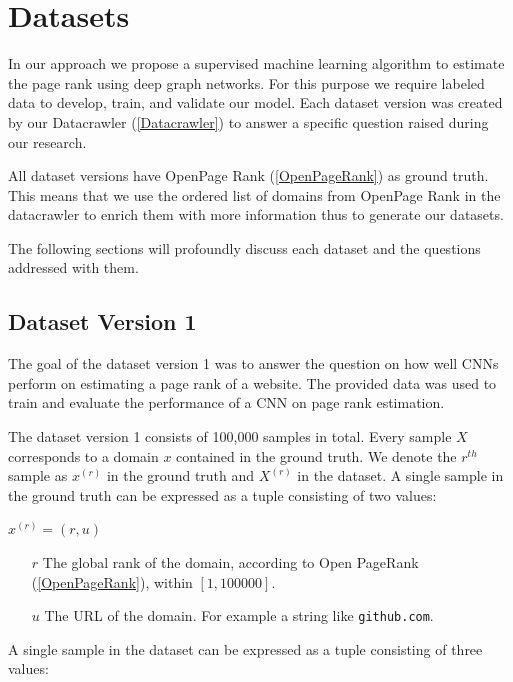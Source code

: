 
\section{Datasets}
\label{datasets}
In our approach we propose a supervised machine learning algorithm to estimate the page rank using deep graph networks. For this purpose we require labeled data to develop, train, and validate our model. Each dataset version was created by our Datacrawler (\ref{Datacrawler}) to answer a specific question raised during our research. 

All dataset versions have OpenPage Rank (\ref{OpenPageRank}) as ground truth. This means that we use the ordered list of domains from OpenPage Rank in the datacrawler to enrich them with more information thus to generate our datasets.

The following sections will profoundly discuss each dataset and the questions addressed with them. 

\subsection{Dataset Version 1}
\label{DatasetVersion1}
The goal of the dataset version 1 was to answer the question on how well CNNs perform on estimating a page rank of a website. The provided data was used to train and evaluate the performance of a CNN on page rank estimation.

The dataset version 1 consists of 100,000 samples in total. Every sample $X$ corresponds to a domain $x$ contained in the ground truth. We denote the $r^{th}$ sample as $x^{(r)}$ in the ground truth and $X^{(r)}$ in the dataset. 
A single sample in the ground truth can be expressed as a tuple consisting of two values:

\begin{center}
	$x^{(r)} = (r, u)$
	\begin{itemize}
		\item[$r$] The global rank of the domain, according to Open PageRank (\ref{OpenPageRank}), within $[1, 100000]$. 
		\item[$u$] The URL of the domain. For example a string like \texttt{github.com}.
	\end{itemize}
\end{center}

A single sample in the dataset can be expressed as a tuple consisting of three values:

